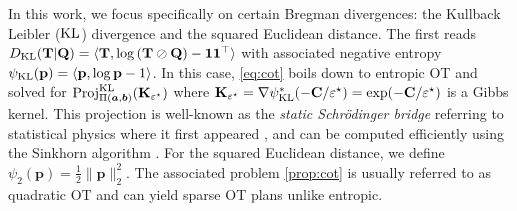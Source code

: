 In this work, we focus specifically on 
certain Bregman divergences: the Kullback Leibler ($\operatorname{KL}$) divergence and the squared Euclidean distance.
The first reads $D_{\operatorname{KL}}({\mathbf{T}} | {\mathbf{Q}}) = \langle {\mathbf{T}}, \log \left({\mathbf{T}} \oslash {\mathbf{Q}} \right) - \bm{1} \bm{1}^\top \rangle$ with associated negative entropy $\psi_{\operatorname{KL}}(\mathbf{p}) = \langle \mathbf{p}, \log \mathbf{p} - 1 \rangle$. In this case, \eqref{eq:cot} boils down to entropic OT and solved for $\operatorname{Proj}^{\operatorname{KL}}_{\Pi(\bm{a}, \bm{b})}({\mathbf{K}}_{\varepsilon^\star})$ where ${\mathbf{K}}_{\varepsilon^\star} = \nabla \psi_{\operatorname{KL}}^{*}(-{\mathbf{C}} / \varepsilon^\star) = \exp(-{\mathbf{C}} / \varepsilon^\star)$ is a Gibbs kernel. This projection is well-known as the \emph{static Schrödinger bridge} \citep{leonard2013survey} referring to statistical physics where it first appeared \citep{schrodinger1931umkehrung}, and can be computed efficiently using the Sinkhorn algorithm \citep{cuturi2013sinkhorn}. For the squared Euclidean distance, we define $\psi_{2}(\mathbf{p}) = \frac{1}{2} \| \mathbf{p} \|^2_2$. The associated problem \eqref{prop:cot} is usually referred to as quadratic OT \citep{lorenz2021quadratically} and can yield sparse OT plans unlike entropic.

